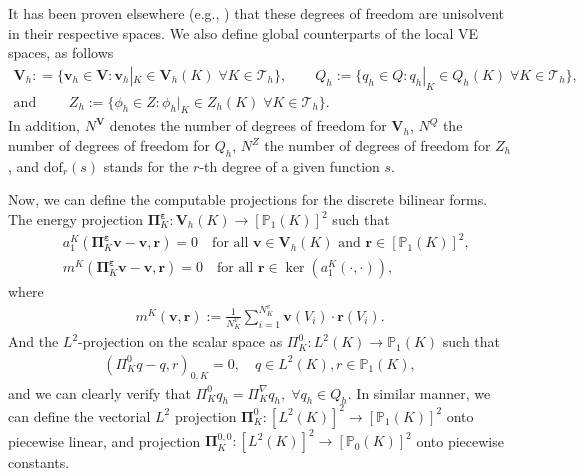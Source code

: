 \documentclass[smallextended]{svjour3}
\numberwithin{equation}{section}
\numberwithin{figure}{section}
\numberwithin{table}{section}
\newcommand\bV{\mathbf{V}}
\newcommand\bPi{\boldsymbol{\Pi}}
\newcommand\beps{\boldsymbol{\varepsilon}}
\newcommand\bv{\boldsymbol{v}}
\begin{document}
	It has been proven elsewhere (e.g.,  \cite{ahmad13} ) that these degrees of
	freedom are unisolvent in their respective spaces. We also define global counterparts of the local VE spaces, as follows
	\begin{gather*}
		\bV_h : = \lbrace \bv_h \in \bV : \bv_h |_K \in \bV_h(K) \; \forall K \in \mathcal{T}_h \rbrace, \qquad Q_h := \lbrace q_h \in Q : q_h |_K \in Q_h(K) \; \forall K \in \mathcal{T}_h \rbrace,\\
	\text{and }	\qquad Z_h := \lbrace \phi_h \in Z : \phi_h |_K \in Z_h(K) \; \forall K \in \mathcal{T}_h \rbrace.
	\end{gather*}
	In addition, $N^\bV$ denotes the number of degrees of freedom for $\bV_h$, $N^Q$ the number of degrees of freedom for $Q_h$,
	$N^Z$ the number of degrees of freedom for $Z_h$,
	and $\text{dof}_r(s)$ stands for the $r$-th degree of a given function $s$.

    Now, we can define the computable projections for the discrete bilinear forms. The energy projection $\bPi^{\beps}_K : \bV_h(K) \rightarrow [\mathbb{P}_1(K)]^2$ such that
	\begin{align*}
	& a_1^K(\bPi^{\beps}_K \bv - \bv , \boldsymbol{r}) = 0 \quad %
	\text{for all $\bv \in \bV_h(K)$ and $\boldsymbol{r} \in [\mathbb{P}_1(K)]^2$,}\\
	& m^K(\bPi^{\beps}_K \bv - \bv,\boldsymbol{r}) = 0 \quad
	\text{for all $\boldsymbol{r} \in  \ker (a_1^K(\cdot,\cdot))$,}
	\end{align*}	
	where
	\begin{align*}
	m^K (\bv,\boldsymbol{r}):= \frac{1}{N^v_K} \sum_{i=1}^{N^v_K} \bv(V_i) \cdot \boldsymbol{r}(V_i).
	\end{align*}
     And the $L^2$-projection on the scalar space as $\Pi^0_K: L^2(K) \rightarrow \mathbb{P}_1(K)$ such that
	\begin{align*}
	(\Pi_{K}^0 q - q, r)_{0,K} = 0, \quad q \in L^2(K), r \in \mathbb{P}_1(K),
	\end{align*}
	and we can clearly verify that $\Pi_{K}^0 q_h =   \Pi_{K}^{\nabla} q_h, \; \forall q_h \in Q_h$. In similar manner, we can define the vectorial $L^2$ projection $\bPi^0_K: [L^2(K)]^2 \rightarrow [\mathbb{P}_1(K)]^2$ onto piecewise linear, and projection $\bPi^{0,0}_K: [L^2(K)]^2 \rightarrow [\mathbb{P}_0(K)]^2$ onto piecewise constants. 
    
\end{document}

